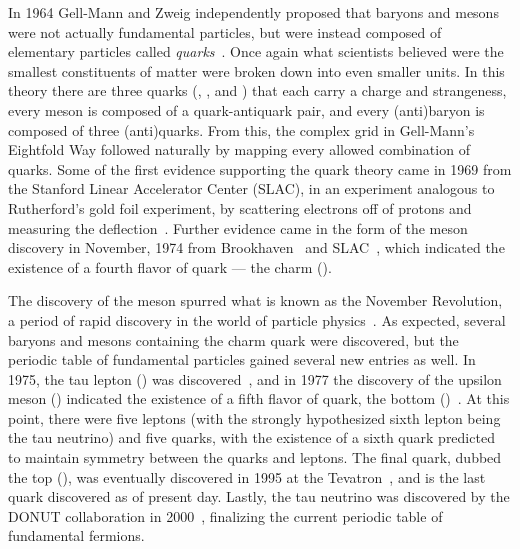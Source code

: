 In 1964 Gell-Mann and Zweig independently proposed that baryons and mesons were not actually fundamental particles, but were instead composed of elementary particles called \textit{quarks}~\cite{gellmann_quarks,zweig_quarks}. Once again what scientists believed were the smallest constituents of matter were broken down into even smaller units. In this theory there are three quarks (\PQu, \PQd, and \PQs) that each carry a charge and strangeness, every meson is composed of a quark-antiquark pair, and every (anti)baryon is composed of three (anti)quarks. From this, the complex grid in Gell-Mann's Eightfold Way followed naturally by mapping every allowed combination of quarks. Some of the first evidence supporting the quark theory came in 1969 from the Stanford Linear Accelerator Center (SLAC), in an experiment analogous to Rutherford's gold foil experiment, by scattering electrons off of protons and measuring the deflection~\cite{slac_quark}. Further evidence came in the form of the \PJGy meson discovery in November, 1974 from Brookhaven~\cite{jpsi_brookhaven} and SLAC~\cite{jpsi_slac}, which indicated the existence of a fourth flavor of quark --- the charm (\PQc).

The discovery of the \PJGy meson spurred what is known as the November Revolution, a period of rapid discovery in the world of particle physics~\cite{revolution}. As expected, several baryons and mesons containing the charm quark were discovered, but the periodic table of fundamental particles gained several new entries as well. In 1975, the tau lepton (\PGt) was discovered~\cite{tau_discovery}, and in 1977 the discovery of the upsilon meson (\PGU) indicated the existence of a fifth flavor of quark, the bottom (\PQb)~\cite{upsilon_discovery}. At this point, there were five leptons (with the strongly hypothesized sixth lepton being the tau neutrino) and five quarks, with the existence of a sixth quark predicted to maintain symmetry between the quarks and leptons. The final quark, dubbed the top (\PQt), was eventually discovered in 1995 at the Tevatron~\cite{top_discovery}, and is the last quark discovered as of present day. Lastly, the tau neutrino was discovered by the DONUT collaboration in 2000~\cite{nu_tau_discovery}, finalizing the current periodic table of fundamental fermions.

